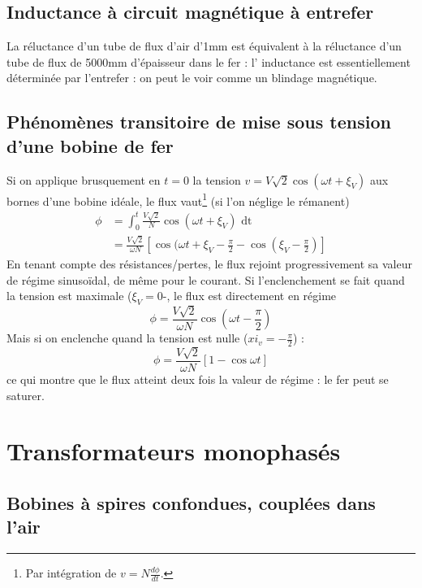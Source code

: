 	\subsection{Inductance à circuit magnétique à entrefer}
	La réluctance d'un tube de flux d'air d'1mm est équivalent à la 
	réluctance d'un tube de flux de 5000mm d'épaisseur dans le fer : l'
	inductance est essentiellement déterminée par l'entrefer : on peut le 
	voir comme un blindage magnétique.
	
	\subsection{Phénomènes transitoire de mise sous tension d'une bobine 
	de fer}
	Si on applique brusquement en $t=0$ la tension $v=V\sqrt{2}\cos(\omega 
	t+\xi_V)$ aux bornes d'une bobine idéale, le flux vaut\footnote{Par 
	intégration de $v = N\frac{d\phi}{dt}$.} (si l'on néglige le rémanent)
	\begin{equation}
	\begin{array}{ll}
	\phi &= \int_0^t \frac{V\sqrt{2}}{N}\cos(\omega t + \xi_V)\text{ dt}\\
	 &= \frac{V\sqrt{2}}{\omega N}\left[\cos(\omega t + \xi_V - \frac{\pi}{2}
	 -\cos(\xi_V-\frac{\pi}{2})\right]
	\end{array}	
	\end{equation}
	En tenant compte des résistances/pertes, le flux rejoint progressivement 
	sa valeur de régime sinusoïdal, de même pour le courant. Si l'enclenchement 
	se fait quand la tension est maximale ($\xi_V=0$-, le flux est directement 
	en régime
	\begin{equation}
	\phi = \frac{V\sqrt{2}}{\omega N}\cos\left(\omega t - \frac{\pi}{2}\right)
	\end{equation}	
	Mais si on enclenche quand la tension est nulle ($xi_v = -\frac{\pi}{2}$) :
	\begin{equation}
	\phi = \frac{V\sqrt{2}}{\omega N}[1-\cos\omega t]
	\end{equation}
	ce qui montre que le flux atteint deux fois la valeur de régime : le fer 
	peut se saturer.
		
\section{Transformateurs monophasés}
	\subsection{Bobines à spires confondues, couplées dans l'air}
